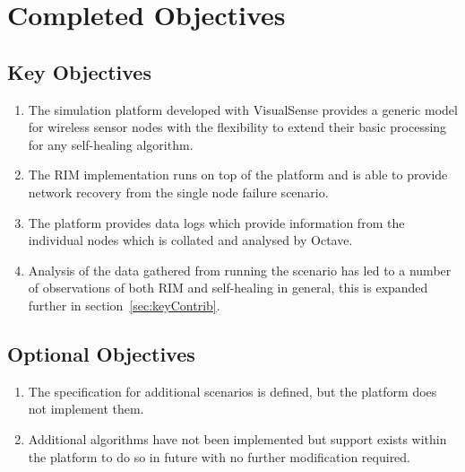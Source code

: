 \documentclass[authoryearcitations]{UoYCSproject}
\begin{document}
\section{Completed Objectives}

\subsection{Key Objectives}
\begin{enumerate}
\item The simulation platform developed with VisualSense provides a generic model for wireless sensor nodes with the flexibility to extend their basic processing for any self-healing algorithm.
\item The RIM implementation runs on top of the platform and is able to provide network recovery from the single node failure scenario.
\item The platform provides data logs which provide information from the individual nodes which is collated and analysed by Octave.
\item Analysis of the data gathered from running the scenario has led to a number of observations of both RIM and self-healing in general, this is expanded further in section~\ref{sec:keyContrib}.
\end{enumerate}

\subsection{Optional Objectives}
\begin{enumerate}
\item The specification for additional scenarios is defined, but the platform does not implement them.
\item Additional algorithms have not been implemented but support exists within the platform to do so in future with no further modification required.
\end{enumerate}
\end{document}
